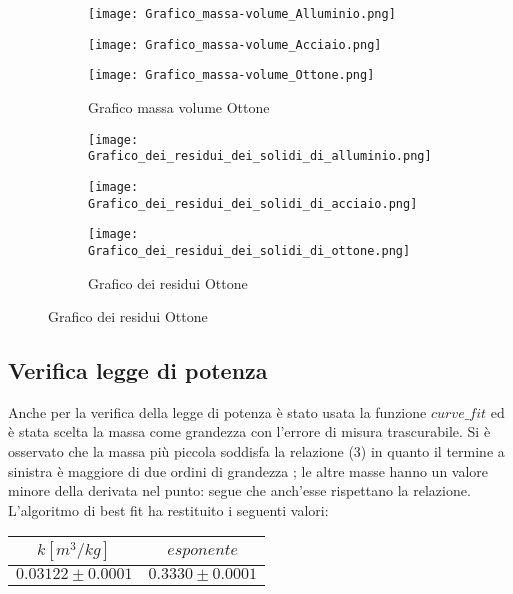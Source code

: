 \documentclass{article}
\begin{document}
\begin{figure}
\centering
		\begin{subfigure}{0.4\textwidth}
   			 \texttt{[image: Grafico\_massa-volume\_Alluminio.png]}
    				\caption{Grafico massa volume Alluminio}
   			\texttt{[image: Grafico\_massa-volume\_Acciaio.png]}
   				 \caption{Grafico massa volume Acciaio}
			\texttt{[image: Grafico\_massa-volume\_Ottone.png]}
   				 \caption{Grafico massa volume Ottone}
			
		\end{subfigure}
		\begin{subfigure}{0.4\textwidth}   
			\texttt{[image: Grafico\_dei\_residui\_dei\_solidi\_di\_alluminio.png]}
    				\caption{Grafico dei residui Alluminio}
			\texttt{[image: Grafico\_dei\_residui\_dei\_solidi\_di\_acciaio.png]}
   				 \caption{Grafico dei residui Acciaio}
			\texttt{[image: Grafico\_dei\_residui\_dei\_solidi\_di\_ottone.png]}
   				 \caption{Grafico dei residui Ottone}
		\end{subfigure}
   


\end{figure}



\subsection{Verifica legge di potenza}
Anche per la verifica della legge di potenza è stato usata la funzione $curve\_fit$ ed è stata scelta la massa come grandezza con l'errore di misura trascurabile.
Si è  osservato che la massa più piccola soddisfa la relazione (3) in quanto il termine a sinistra è maggiore di due ordini di grandezza  ; 
le altre masse hanno un valore  minore della derivata nel punto: segue che anch'esse  rispettano la relazione.
L'algoritmo di best fit ha restituito i seguenti valori:
\begin{table}[H]
    \centering
    \begin{tabular}{|c|c|}
        \hline
        $k[m^3/kg]$ & $esponente$ \\
        \hline
       $ 0.03122\pm0.0001 $ & $0.3330\pm0.0001$\\

        \hline
    \end{tabular}
    
\end{table}
\end{document}
